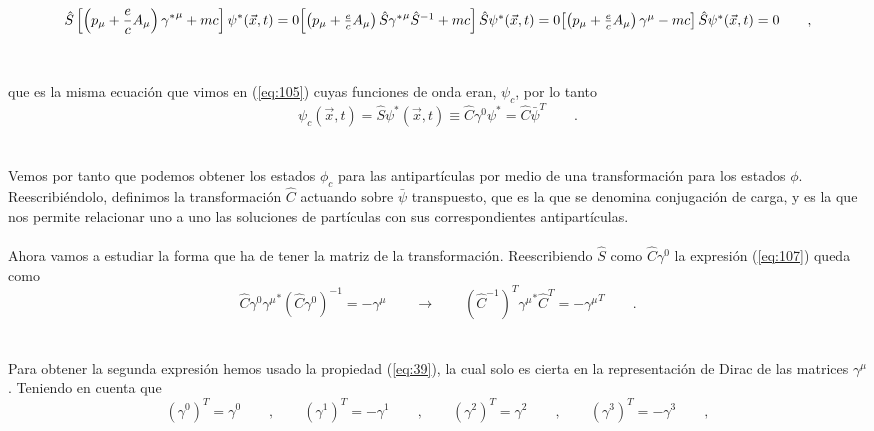 \documentclass[11pt,letterpaper]{article}     %
\begin{document}
\begin{equation}\label{eq:109}
\hat{S}\left[\left(p_\mu + \frac{e}{c}A_\mu \right) {\gamma^*}^\mu +mc \right] \psi^*(\vec{x},t)=0 $$\\$$
\left[\left(p_\mu + \frac{e}{c}A_\mu \right)\hat{S} {\gamma^*}^\mu \hat{S}^{-1} +mc \right]\hat{S} \psi^*(\vec{x},t)=0 $$\\$$
\left[\left(p_\mu + \frac{e}{c}A_\mu \right) \gamma^\mu - mc \right] \hat{S}\psi^*(\vec{x},t)=0 \qquad ,
\end{equation} \\ \\
que es la misma ecuación que vimos en (\ref{eq:105}) cuyas funciones de onda eran, $\psi_c$, por lo tanto
\begin{equation}\label{eq:110}
\psi_c(\vec{x},t)=\hat{S}\psi^*(\vec{x},t) \equiv \hat{C} \gamma^0 \psi^*=\hat{C} \bar{\psi}^T \qquad .
\end{equation} \\ \\
Vemos por tanto que podemos obtener los estados $\phi_c$ para las antipartículas por medio de una transformación para los estados $\phi$. Reescribiéndolo, definimos la transformación $\hat{C}$ actuando sobre $\bar{\psi}$ transpuesto, que es la que se denomina conjugación de carga, y es la que nos permite relacionar uno a uno las soluciones de partículas con sus correspondientes antipartículas. \\ \\
Ahora vamos a estudiar la forma que ha de tener la matriz de la transformación. Reescribiendo $\hat{S}$ como $\hat{C}\gamma^0$ la expresión (\ref{eq:107}) queda como
\begin{equation}\label{eq:111}
\hat{C}\gamma^0 {\gamma^\mu}^* (\hat{C} \gamma^0)^{-1}=- \gamma^\mu \qquad \rightarrow \qquad (\hat{C}^{-1})^T {\gamma^\mu}^* \hat{C} ^{T}=- {\gamma^\mu} ^{T}\qquad .
\end{equation} \\ \\
Para obtener la segunda expresión hemos usado la propiedad (\ref{eq:39}), la cual solo es cierta en la representación de Dirac de las matrices $\gamma^\mu$. Teniendo en cuenta que
\begin{equation}\label{eq:112}
(\gamma^0)^T=\gamma^0 \qquad , \qquad (\gamma^1)^T=-\gamma^1 \qquad , \qquad (\gamma^2)^T=\gamma^2 \qquad , \qquad (\gamma^3)^T=-\gamma^3 \qquad,
\end{equation} \\ \\
\end{document}
